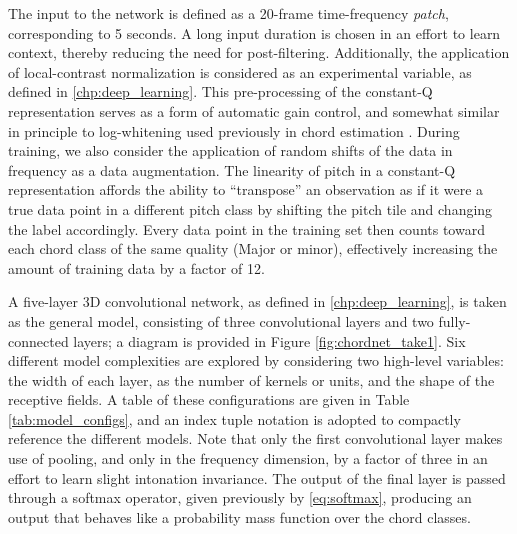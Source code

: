 The input to the network is defined as a 20-frame time-frequency \emph{patch}, corresponding to 5 seconds.
A long input duration is chosen in an effort to learn context, thereby reducing the need for post-filtering.
Additionally, the application of local-contrast normalization is considered as an experimental variable, as defined in \ref{chp:deep_learning}.
This pre-processing of the constant-Q representation serves as a form of automatic gain control, and somewhat similar in principle to log-whitening used previously in chord estimation \cite{Cho2011}.
During training, we also consider the application of random shifts of the data in frequency as a data augmentation.
The linearity of pitch in a constant-Q representation affords the ability to ``transpose'' an observation as if it were a true data point in a different pitch class by shifting the pitch tile and changing the label accordingly.
Every data point in the training set then counts toward each chord class of the same quality (Major or minor), effectively increasing the amount of training data by a factor of 12.

A five-layer 3D convolutional network, as defined in \ref{chp:deep_learning}, is taken as the general model, consisting of three convolutional layers and two fully-connected layers; a diagram is provided in Figure \ref{fig:chordnet_take1}.
Six different model complexities are explored by considering two high-level variables: the width of each layer, as the number of kernels or units, and the shape of the receptive fields.
A table of these configurations are given in Table \ref{tab:model_configs}, and an index tuple notation is adopted to compactly reference the different models.
Note that only the first convolutional layer makes use of pooling, and only in the frequency dimension, by a factor of three in an effort to learn slight intonation invariance.
The output of the final layer is passed through a softmax operator, given previously by \ref{eq:softmax}, producing an output that behaves like a probability mass function over the chord classes.


